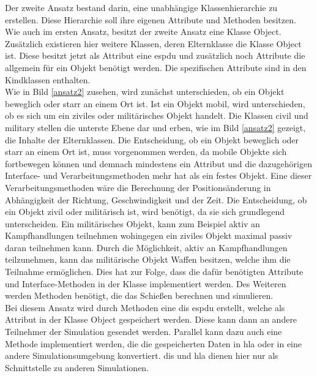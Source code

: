 Der zweite Ansatz bestand darin, eine unabhängige Klassenhierarchie zu erstellen. Diese Hierarchie soll ihre eigenen Attribute und Methoden besitzen. Wie auch im ersten Ansatz, besitzt der zweite Ansatz eine Klasse \glqq Object\grqq{}. Zusätzlich existieren hier weitere Klassen, deren Elternklasse die Klasse \glqq Object\grqq{} ist. Diese besitzt jetzt als Attribut eine \ac{espdu} und zusätzlich noch Attribute die allgemein für ein Objekt benötigt werden. Die spezifischen Attribute sind  in den  Kindklassen enthalten. \\  Wie in Bild \ref{ansatz2} zusehen, wird zunächst unterschieden, ob ein Objekt beweglich oder starr an einem Ort ist. Ist ein Objekt mobil, wird unterschieden, ob es sich um ein ziviles oder militärisches Objekt handelt. Die Klassen \glqq civil\grqq{} und \glqq military\grqq{} stellen die unterste Ebene dar und erben, wie im Bild \ref{ansatz2} gezeigt, die Inhalte der Elternklassen. Die Entscheidung, ob ein Objekt beweglich oder starr an einem Ort ist, muss vorgenommen werden, da mobile Objekte sich fortbewegen können und demnach mindestens ein Attribut und die dazugehörigen Interface- und Verarbeitungsmethoden mehr hat als ein festes Objekt. Eine dieser  Verarbeitungsmethoden wäre die Berechnung der Positionsänderung in Abhängigkeit der Richtung, Geschwindigkeit und der Zeit. Die Entscheidung, ob ein Objekt zivil oder militärisch ist, wird benötigt, da sie sich grundlegend unterscheiden. Ein militärisches Objekt, kann zum Beispiel aktiv an Kampfhandlungen teilnehmen wohingegen ein ziviles Objekt maximal passiv daran teilnehmen kann. Durch die  Möglichkeit, aktiv an Kampfhandlungen teilzunehmen, kann das militärische Objekt Waffen besitzen, welche ihm die Teilnahme ermöglichen. Dies hat zur Folge, dass die dafür benötigten Attribute und Interface-Methoden in der Klasse implementiert werden. Des Weiteren werden Methoden benötigt, die das Schießen berechnen und simulieren. \\
Bei diesem Ansatz wird durch Methoden eine \ac{dis} \acl{espdu} erstellt, welche als Attribut in der Klasse \glqq Object\grqq{} gespeichert werden. Diese kann dann an andere Teilnehmer der Simulation gesendet werden. Parallel kann dazu auch eine Methode implementiert werden, die die gespeicherten Daten in \ac{hla} oder in eine andere Simulationsumgebung  konvertiert. \ac{dis} und \ac{hla} dienen hier nur als Schnittstelle zu anderen Simulationen. 
